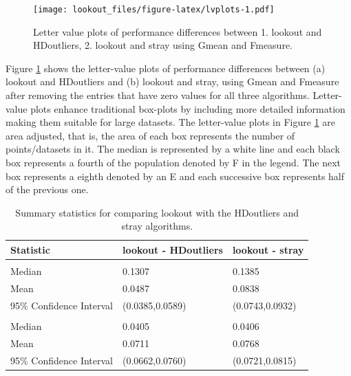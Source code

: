 \documentclass[11pt,a4paper,]{article}
\theoremstyle{definition}
\theoremstyle{definition}
\theoremstyle{definition}
\theoremstyle{remark}
\begin{document}
\begin{figure}
\centering
\texttt{[image: lookout\_files/figure-latex/lvplots-1.pdf]}
\caption{\label{fig:lvplots}Letter value plots of performance differences between 1. lookout and HDoutliers, 2. lookout and stray using Gmean and Fmeasure.}
\end{figure}

Figure \ref{fig:lvplots} shows the letter-value plots \autocite{lvplots} of performance differences between
(a) lookout and HDoutliers and
(b) lookout and stray,
using Gmean and Fmeasure after removing the entries that have zero values for all three algorithms. Letter-value plots enhance traditional box-plots by including more detailed information making them suitable for large datasets. The letter-value plots in Figure \ref{fig:lvplots} are area adjusted, that is, the area of each box represents the number of points/datasets in it. The median is represented by a white line and each black box represents a fourth of the population denoted by F in the legend. The next box represents a eighth denoted by an E and each successive box represents half of the previous one.

\begin{table}

\caption{\label{tab:table}Summary statistics for comparing lookout with the HDoutliers and stray algorithms.}
\centering
\begin{tabular}[t]{lll}
\toprule
Statistic & lookout - HDoutliers & lookout - stray\\
\midrule
\addlinespace[0.3em]
\multicolumn{3}{l}{\textbf{Fmeasure}}\\
\hspace{1em}Median & 0.1307 & 0.1385\\
\hspace{1em}Mean & 0.0487 & 0.0838\\
\hspace{1em}95\% Confidence Interval & (0.0385,0.0589) & (0.0743,0.0932)\\
\addlinespace[0.3em]
\multicolumn{3}{l}{\textbf{Gmean}}\\
\hspace{1em}Median & 0.0405 & 0.0406\\
\hspace{1em}Mean & 0.0711 & 0.0768\\
\hspace{1em}95\% Confidence Interval & (0.0662,0.0760) & (0.0721,0.0815)\\
\bottomrule
\end{tabular}
\end{table}
\end{document}
